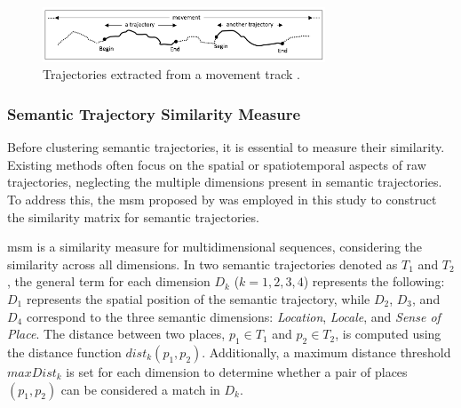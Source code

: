 \documentclass{article}
\theoremstyle{remark}
\begin{document}
\begin{figure} [!h]
\centering
\includegraphics[width=0.75\textwidth]{figures/begin_end.png}
\caption{\label{fig:trajectory_begin_end}Trajectories extracted from a movement track \citep{parent_semantic_2013}.}
\end{figure}


\subsubsection{Semantic Trajectory Similarity Measure} \label{traj_similarity}
Before clustering semantic trajectories, it is essential to measure their similarity. Existing methods often focus on the spatial or spatiotemporal aspects of raw trajectories, neglecting the multiple dimensions present in semantic trajectories. To address this, the \acrfull{msm} proposed by \cite{furtado_multidimensional_2016} was employed in this study to construct the similarity matrix for semantic trajectories. 

\acrshort{msm} is a similarity measure for multidimensional sequences, considering the similarity across all dimensions. In two semantic trajectories denoted as $T_{1}$ and $T_{2}$, the general term for each dimension $D_{k}$ ($k = 1, 2, 3, 4$) represents the following: $D_{1}$ represents the spatial position of the semantic trajectory, while $D_{2}$, $D_{3}$, and $D_{4}$ correspond to the three semantic dimensions: \textit{Location}, \textit{Locale}, and \textit{Sense of Place}. The distance between two places, $p_{1} \in T_{1}$ and $p_{2} \in T_{2}$, is computed using the distance function $dist_{k}(p_{1},p_{2})$. Additionally, a maximum distance threshold $maxDist_{k}$ is set for each dimension to determine whether a pair of places $(p_{1},p_{2})$ can be considered a match in $D_{k}$.
\end{document}
